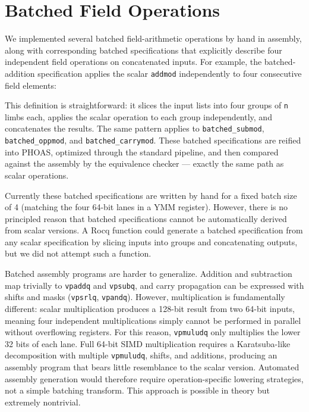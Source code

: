 \section{Batched Field Operations}
\label{sec:batched}

We implemented several batched field-arithmetic operations by hand in assembly, along with corresponding batched specifications that explicitly describe four independent field operations on concatenated inputs.
For example, the batched-addition specification applies the scalar \texttt{addmod} independently to four consecutive field elements:


This definition is straightforward: it slices the input lists into four groups of \texttt{n} limbs each, applies the scalar operation to each group independently, and concatenates the results.
The same pattern applies to \texttt{batched_submod}, \texttt{batched_oppmod}, and \texttt{batched_carrymod}.
These batched specifications are reified into PHOAS, optimized through the standard pipeline, and then compared against the assembly by the equivalence checker --- exactly the same path as scalar operations.

Currently these batched specifications are written by hand for a fixed batch size of 4 (matching the four 64-bit lanes in a YMM register).
However, there is no principled reason that batched specifications cannot be automatically derived from scalar versions. A Rocq function could generate a batched specification from any scalar specification by slicing inputs into groups and concatenating outputs, but we did not attempt such a function.

Batched assembly programs are harder to generalize.
Addition and subtraction map trivially to \texttt{vpaddq} and \texttt{vpsubq}, and carry propagation can be expressed with shifts and masks (\texttt{vpsrlq}, \texttt{vpandq}).
However, multiplication is fundamentally different: scalar multiplication produces a 128-bit result from two 64-bit inputs, meaning four independent multiplications simply cannot be performed in parallel without overflowing registers.
For this reason, \texttt{vpmuludq} only multiplies the lower 32 bits of each lane.
Full 64-bit SIMD multiplication requires a Karatsuba-like decomposition with multiple \texttt{vpmuludq}, shifts, and additions, producing an assembly program that bears little resemblance to the scalar version.
Automated assembly generation would therefore require operation-specific lowering strategies, not a simple batching transform. This approach is possible in theory but extremely nontrivial.


